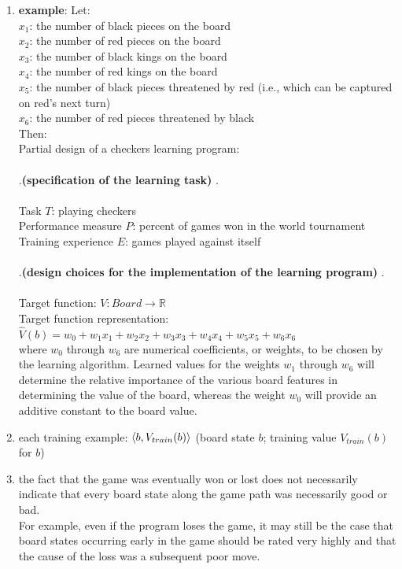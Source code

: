\begin{enumerate}
    \item[] \textbf{example}: Let:
    \\
    $x_1$: the number of black pieces on the board 
    \\
    $x_2$: the number of red pieces on the board 
    \\
    $x_3$: the number of black kings on the board 
    \\
    $x_4$: the number of red kings on the board 
    \\
    $x_5$: the number of black pieces threatened by red (i.e., which can be captured on red's next turn) 
    \\
    $x_6$: the number of red pieces threatened by black 
    \vspace{0.3cm} \noindent
    \\
    Then: 
    \\
    Partial design of a checkers learning program: 
    \\ \\
    .\hfill \textbf{(specification of the learning task)} \hfill.
    \\ \\
    Task $T$: playing checkers 
    \\
    Performance measure $P$: percent of games won in the world tournament 
    \\
    Training experience $E$: games played against itself 
    \\ \\
    .\hfill \textbf{(design choices for the implementation of the learning program)} \hfill.
    \\ \\
    Target function: $V: Board \to \mathbb{R}$ 
    \\
    Target function representation: $\hat{V}(b) = w_0 + w_1x_1 + w_2x_2 + w_3x_3 + w_4x_4 + w_5x_5 + w_6x_6$ 
    \\
    where $w_0$ through $w_6$ are numerical coefficients, or weights, to be chosen by the learning algorithm. Learned values for the weights $w_1$ through $w_6$ will determine the relative importance of the various board features in determining the value of the board, whereas the weight $w_0$ will provide an additive constant to the board value. 
    
    \item each training example: $\left< b, V_{train}(b)\right >$
        \hfill (board state $b$; training value $V_{train}(b)$ for $b$)

    \item the fact that the game was eventually won or lost does not necessarily indicate that every board state along the game path was necessarily good or bad.
    \hfill \cite{ml/book/Machine-Learning/Tom-M-Mitchell}
    \\
    For example, even if the program loses the game, it may still be the case that board states occurring early in the game should be rated very highly and that the cause of the loss was a subsequent poor move. 
    \hfill \cite{ml/book/Machine-Learning/Tom-M-Mitchell}


\end{enumerate}
